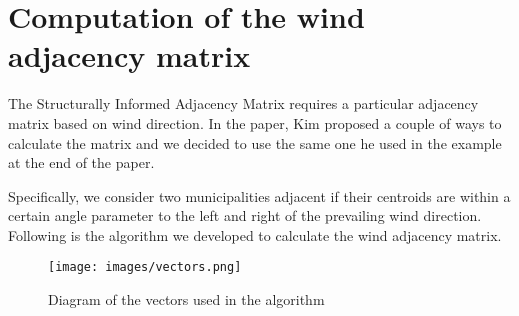 \documentclass[11pt,a4paper]{article}
\begin{document}
\section{Computation of the wind adjacency matrix}
\label{sec:SIAM}
The Structurally Informed Adjacency Matrix requires a particular adjacency matrix based on wind direction. In the paper, Kim proposed a couple of ways to calculate the matrix and we decided to use the same one he used in the example at the end of the paper.

Specifically, we consider two municipalities adjacent if their centroids are within a certain angle parameter to the left and
right of the prevailing wind direction. Following is the algorithm we developed to calculate the wind adjacency matrix.

\begin{figure}[H]
    \centering
    \texttt{[image: images/vectors.png]}
    \caption{Diagram of the vectors used in the algorithm}
    \label{fig:vectors}
\end{figure}
\end{document}
